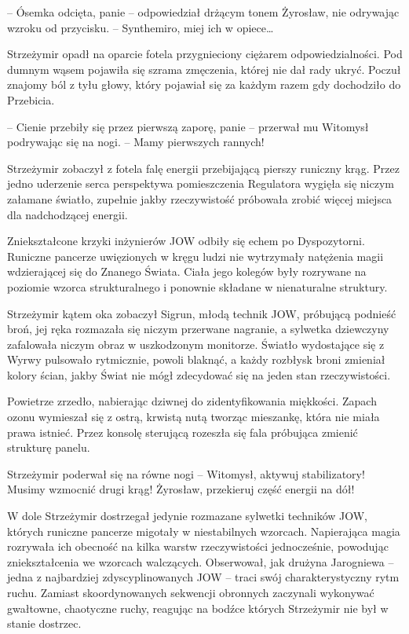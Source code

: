 \par\noindent-- Ósemka odcięta, panie -- odpowiedział drżącym tonem Żyrosław, nie odrywając wzroku od przycisku. -- Synthemiro, miej ich w opiece\dots
\par\indent Strzeżymir opadł na oparcie fotela przygnieciony ciężarem odpowiedzialności. Pod dumnym wąsem pojawiła się szrama zmęczenia, której nie dał rady ukryć. Poczuł znajomy ból z tyłu głowy, który pojawiał się za każdym razem gdy dochodziło do Przebicia.
\par\noindent-- Cienie przebiły się przez pierwszą zaporę, panie -- przerwał mu Witomysł podrywając się na nogi. -- Mamy pierwszych rannych!
\par\indent Strzeżymir zobaczył z fotela falę energii przebijającą pierszy runiczny krąg.  Przez jedno uderzenie serca perspektywa pomieszczenia Regulatora wygięła się niczym załamane światło, zupełnie jakby rzeczywistość próbowała zrobić więcej miejsca dla nadchodzącej energii. 
\par\indent Zniekształcone krzyki inżynierów JOW odbiły się echem po Dyspozytorni. Runiczne pancerze uwięzionych w kręgu ludzi nie wytrzymały natężenia magii wdzierającej się do Znanego Świata. Ciała jego kolegów były rozrywane na poziomie wzorca strukturalnego i ponownie składane w nienaturalne struktury.
\par\indent Strzeżymir kątem oka zobaczył Sigrun, młodą technik JOW, próbującą podnieść broń, jej ręka rozmazała się niczym przerwane nagranie, a sylwetka dziewczyny zafalowała niczym obraz w uszkodzonym monitorze. Światło wydostające się z Wyrwy pulsowało rytmicznie, powoli blaknąć, a każdy rozbłysk broni zmieniał kolory ścian, jakby Świat nie mógł zdecydować się na jeden stan rzeczywistości.
\par\indent Powietrze zrzedło, nabierając dziwnej do zidentyfikowania miękkości. Zapach ozonu wymieszał się z ostrą, krwistą nutą tworząc mieszankę, która nie miała prawa istnieć. Przez konsolę sterującą rozeszła się fala próbująca zmienić strukturę panelu.
\par\noindent Strzeżymir poderwał się na równe nogi -- Witomysł, aktywuj stabilizatory! Musimy wzmocnić drugi krąg! Żyrosław, przekieruj część energii na dół!
\par\indent W dole Strzeżymir dostrzegał jedynie rozmazane sylwetki techników JOW, których runiczne pancerze migotały w niestabilnych wzorcach. Napierająca magia rozrywała ich obecność na kilka warstw rzeczywistości jednocześnie, powodując zniekształcenia we wzorcach walczących. Obserwował, jak drużyna Jarogniewa -- jedna z najbardziej zdyscyplinowanych JOW -- traci swój charakterystyczny rytm ruchu. Zamiast skoordynowanych sekwencji obronnych zaczynali wykonywać gwałtowne, chaotyczne ruchy, reagując na bodźce których Strzeżymir nie był w stanie dostrzec.
